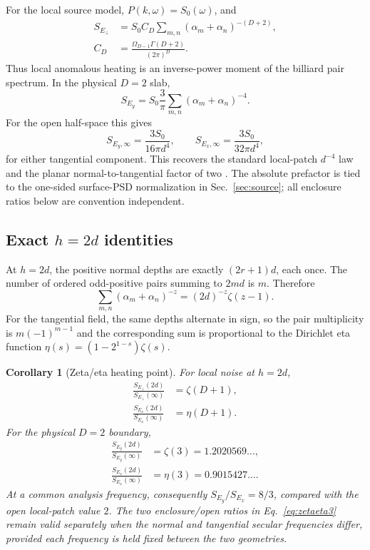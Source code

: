 \documentclass[aps,pra,twocolumn,superscriptaddress,longbibliography,nofootinbib,floatfix]{revtex4-2}
\newtheorem{corollary}{Corollary}
\theoremstyle{remark}
\begin{document}
For the local source model, $P(k,\omega)=S_0(\omega)$, and
\begin{align}
S_{E_\perp}&=S_0 C_D\sum_{m,n}(\alpha_m+\alpha_n)^{-(D+2)},\nonumber\\
C_D&=\frac{\Omega_{D-1}\Gamma(D+2)}{(2\pi)^D}.
\label{eq:returnzeta}
\end{align}
Thus local anomalous heating is an inverse-power moment of the billiard pair spectrum.  In the physical $D=2$ slab,
\begin{equation}
\boxed{\displaystyle
S_{E_y}=S_0\frac{3}{\pi}\sum_{m,n}(\alpha_m+\alpha_n)^{-4}.}
\label{eq:physicalzeta}
\end{equation}
For the open half-space this gives
\begin{equation}
S_{E_y,\infty}=\frac{3S_0}{16\pi d^4},\qquad
S_{E_x,\infty}=\frac{3S_0}{32\pi d^4},
\label{eq:openprefactors}
\end{equation}
for either tangential component.  This recovers the standard local-patch $d^{-4}$ law and the planar normal-to-tangential factor of two \cite{Dubessy2009,Low2011}.  The absolute prefactor is tied to the one-sided surface-PSD normalization in Sec.~\ref{sec:source}; all enclosure ratios below are convention independent.

\subsection{Exact \texorpdfstring{$h=2d$}{h=2d} identities}

At $h=2d$, the positive normal depths are exactly $(2r+1)d$, each once.  The number of ordered odd-positive pairs summing to $2md$ is $m$.  Therefore
\begin{equation}
\sum_{m,n}(\alpha_m+\alpha_n)^{-z}
=(2d)^{-z}\zeta(z-1).
\end{equation}
For the tangential field, the same depths alternate in sign, so the pair multiplicity is $m(-1)^{m-1}$ and the corresponding sum is proportional to the Dirichlet eta function $\eta(s)=(1-2^{1-s})\zeta(s)$.

\begin{corollary}[Zeta/eta heating point]
For local noise at $h=2d$,
\begin{align}
\frac{S_{E_\perp}(2d)}{S_{E_\perp}(\infty)}&=\zeta(D+1),\label{eq:zetageneral}\\
\frac{S_{E_x}(2d)}{S_{E_x}(\infty)}&=\eta(D+1).
\label{eq:etageneral}
\end{align}
For the physical $D=2$ boundary,
\begin{align}
\frac{S_{E_y}(2d)}{S_{E_y}(\infty)}&=\zeta(3)=1.2020569\ldots,\nonumber\\
\frac{S_{E_x}(2d)}{S_{E_x}(\infty)}&=\eta(3)=0.9015427\ldots.
\label{eq:zetaeta3}
\end{align}
At a common analysis frequency, consequently $S_{E_y}/S_{E_x}=8/3$, compared with the open local-patch value $2$.  The two enclosure/open ratios in Eq.~\eqref{eq:zetaeta3} remain valid separately when the normal and tangential secular frequencies differ, provided each frequency is held fixed between the two geometries.
\end{corollary}
\end{document}
